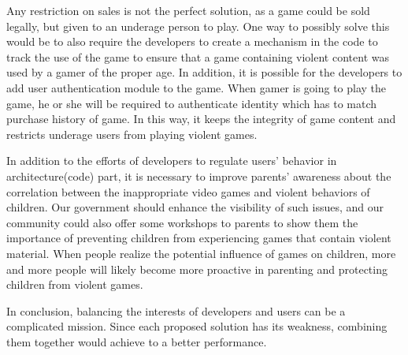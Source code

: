 Any restriction on sales is not the perfect solution, as a game could be sold legally, but given to an underage person to play. One way to possibly solve this would be to also require the developers to create a mechanism in the code to track the use of the game to ensure that a game containing violent content was used by a gamer of the proper age. In addition, it is possible for the developers to add user authentication module to the game. When gamer is going to play the game, he or she will be required to authenticate identity which has to match purchase history of game. In this way, it keeps the integrity of game content and restricts underage users from playing violent games.

In addition to the efforts of developers to regulate users' behavior in architecture(code) part, it is necessary to improve parents' awareness about the correlation between the inappropriate video games and violent behaviors of children. Our government should enhance the visibility of such issues, and our community could also offer some workshops to parents to show them the importance of preventing children from experiencing games that contain violent material. When people realize the potential influence of games on children, more and more people will likely become more proactive in parenting and protecting children from violent games.

In conclusion, balancing the interests of developers and users can be a complicated mission. Since each proposed solution has its weakness, combining them together would achieve to a better performance. 

